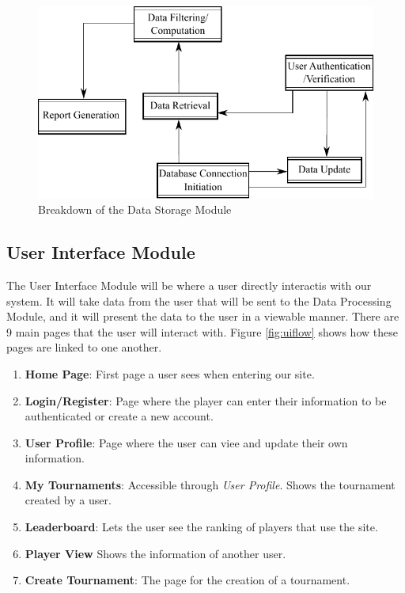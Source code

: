 \documentclass{article}
\begin{document}
\begin{figure}[H]
      \centering
      \includegraphics[width=.8\linewidth]{Figures/FunctionSet.pdf}
      \caption{Breakdown of the Data Storage Module}
      \label{fig:functionset}
\end{figure}



\subsection{User Interface Module}
The User Interface Module will be where a user directly interactis with our system. It will take data from the user that will be sent to the Data Processing Module, and it will present the data to the user in a viewable manner. There are 9 main pages that the user will interact with. Figure \ref{fig:uiflow} shows how these pages are linked to one another.

\begin{enumerate}[noitemsep]
    \item \textbf{Home Page}: First page a user sees when entering our site.
    \item \textbf{Login/Register}: Page where the player can enter their information to be authenticated or create a new account.
    \item \textbf{User Profile}: Page where the user can viee and update their own information.
    \item \textbf{My Tournaments}: Accessible through \emph{User Profile}. Shows the tournament created by a user.
    \item \textbf{Leaderboard}: Lets the user see the ranking of players that use the site.
    \item \textbf{Player View} Shows the information of another user.
     \item \textbf{Create Tournament}: The page for the creation of a tournament.
\end{enumerate}
\end{document}

